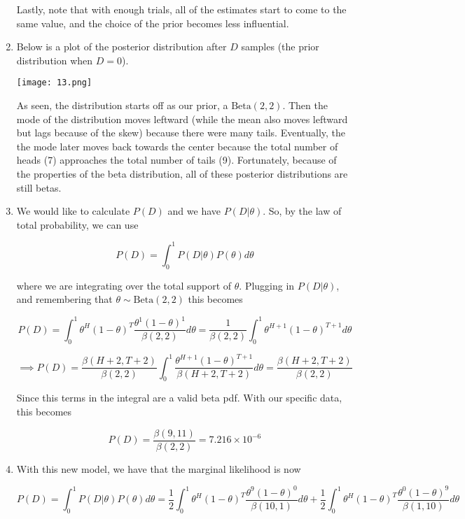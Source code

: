 \documentclass[submit]{harvardml}
\begin{document}
\begin{enumerate}
    Lastly, note that with enough trials, all of the estimates start to come to the same value, and the choice of the prior becomes less influential.
    
    \item
    
    Below is a plot of the posterior distribution after $D$ samples (the prior distribution when $D= 0$).
    
    \begin{center}
        \texttt{[image: 13.png]}
    \end{center}

As seen, the distribution starts off as our prior, a $\textrm{Beta}(2,2)$. Then the mode of the distribution moves leftward (while the mean also moves leftward but lags because of the skew) because there were many tails. Eventually, the the mode later moves back towards the center because the total number of heads (7) approaches the total number of tails (9). Fortunately, because of the properties of the beta distribution, all of these posterior distributions are still betas.

\item We would like to calculate $P(D)$ and we have $P(D|\theta)$. So, by the law of total probability, we can use

$$ P(D) = \int_0^1 P(D|\theta)P(\theta)d\theta$$

where we are integrating over the total support of $\theta$. Plugging in $P(D|\theta)$, and remembering that $\theta \sim \textrm{Beta}(2,2)$ this becomes

$$ P(D) = \int_0^1 \theta^H(1-\theta)^T \frac{\theta^1 (1-\theta)^1}{\beta(2,2)} d\theta = \frac{1}{\beta (2,2)}\int_0^1 \theta^{H+1}(1-\theta)^{T+1}  d\theta$$ 

$$ \implies P(D) = \frac{\beta(H+2, T+2)}{\beta (2,2)}\int_0^1 \frac{\theta^{H+1}(1-\theta)^{T+1}}{\beta(H+2, T+2)}  d\theta = \frac{\beta(H+2, T+2)}{\beta (2,2)}$$

Since this terms in the integral are a valid beta pdf. With our specific data, this becomes 

$$\boxed{P(D) = \frac{\beta(9, 11)}{\beta (2,2)} = 7.216 \times 10^{-6}}$$

\item
With this new model, we have that the marginal likelihood is now 

$$ P(D) = \int_0^1 P(D|\theta)P(\theta)d\theta = \frac{1}{2}\int_0^1 \theta^H(1-\theta)^T \frac{\theta^9 (1-\theta)^0}{\beta(10,1)} d\theta + \frac{1}{2}\int_0^1 \theta^H(1-\theta)^T \frac{\theta^0 (1-\theta)^9}{\beta(1,10)} d\theta$$


\end{enumerate}
\end{document}
